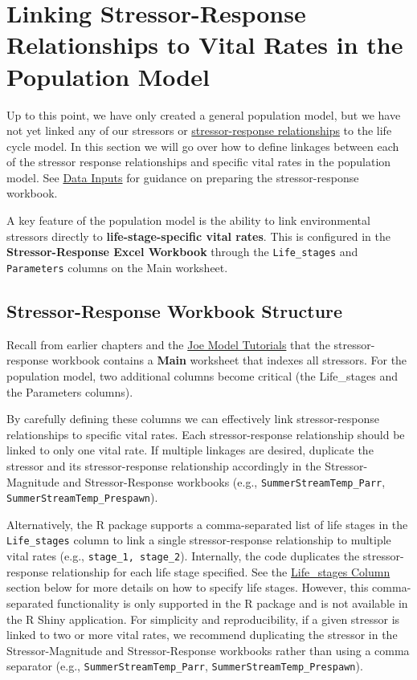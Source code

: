 \documentclass[
  letterpaper,
  DIV=11,
  numbers=noendperiod]{scrreprt}
\begin{document}
\section{Linking Stressor-Response Relationships to Vital Rates in the
Population
Model}\label{linking-stressor-response-relationships-to-vital-rates-in-the-population-model}

Up to this point, we have only created a general population model, but
we have not yet linked any of our stressors or
\hyperref[stressor-response-functions]{stressor-response relationships}
to the life cycle model. In this section we will go over how to define
linkages between each of the stressor response relationships and
specific vital rates in the population model. See
\hyperref[data-inputs]{Data Inputs} for guidance on preparing the
stressor-response workbook.

A key feature of the population model is the ability to link
environmental stressors directly to \textbf{life-stage-specific vital
rates}. This is configured in the \textbf{Stressor-Response Excel
Workbook} through the \texttt{Life\_stages} and \texttt{Parameters}
columns on the Main worksheet.

\subsection{Stressor-Response Workbook
Structure}\label{stressor-response-workbook-structure}

Recall from earlier chapters and the
\href{https://essatech.github.io/CEMPRA/articles/a01-joe-model.html}{Joe
Model Tutorials} that the stressor-response workbook contains a
\textbf{Main} worksheet that indexes all stressors. For the population
model, two additional columns become critical (the Life\_stages and the
Parameters columns).

By carefully defining these columns we can effectively link
stressor-response relationships to specific vital rates. Each
stressor-response relationship should be linked to only one vital rate.
If multiple linkages are desired, duplicate the stressor and its
stressor-response relationship accordingly in the Stressor-Magnitude and
Stressor-Response workbooks (e.g., \texttt{SummerStreamTemp\_Parr},
\texttt{SummerStreamTemp\_Prespawn}).

Alternatively, the R package supports a comma-separated list of life
stages in the \texttt{Life\_stages} column to link a single
stressor-response relationship to multiple vital rates (e.g.,
\texttt{stage\_1,\ stage\_2}). Internally, the code duplicates the
stressor-response relationship for each life stage specified. See the
\hyperref[the-stressor-response-workbook-life_stages-column]{Life\_stages
Column} section below for more details on how to specify life stages.
However, this comma-separated functionality is only supported in the R
package and is not available in the R Shiny application. For simplicity
and reproducibility, if a given stressor is linked to two or more vital
rates, we recommend duplicating the stressor in the Stressor-Magnitude
and Stressor-Response workbooks rather than using a comma separator
(e.g., \texttt{SummerStreamTemp\_Parr},
\texttt{SummerStreamTemp\_Prespawn}).
\end{document}
